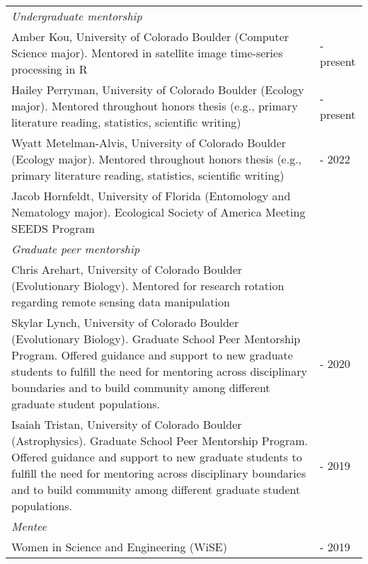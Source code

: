 \begin{longtable}{@{}>{\raggedright}p{5.25in} >{\raggedleft}X@{}}
 \addlinespace[1ex]
 
\emph{Undergraduate mentorship}  & \tabularnewline
Amber Kou, University of Colorado Boulder (Computer Science major). Mentored in satellite image time-series processing in R & 2022 - present \tabularnewline
Hailey Perryman, University of Colorado Boulder (Ecology major). Mentored throughout honors thesis (e.g., primary literature reading, statistics, scientific writing)  & 2022 - present \tabularnewline
Wyatt Metelman-Alvis, University of Colorado Boulder (Ecology major). Mentored throughout honors thesis (e.g., primary literature reading, statistics, scientific writing)  & 2021 - 2022 \tabularnewline
Jacob Hornfeldt, University of Florida (Entomology and Nematology major). Ecological Society of America Meeting SEEDS Program & 2020  \tabularnewline
 \addlinespace[1ex]
 
\emph{Graduate peer mentorship}  & \tabularnewline
Chris Arehart, University of Colorado Boulder (Evolutionary Biology). Mentored for research rotation regarding remote sensing data manipulation & 2021 \tabularnewline
Skylar Lynch, University of Colorado Boulder (Evolutionary Biology). Graduate School Peer Mentorship Program. Offered guidance and support to new graduate students to fulfill the need for mentoring across disciplinary boundaries and to build community among different graduate student populations. & 2019 - 2020 \tabularnewline
Isaiah Tristan, University of Colorado Boulder (Astrophysics). Graduate School Peer Mentorship Program. Offered guidance and support to new graduate students to fulfill the need for mentoring across disciplinary boundaries and to build community among different graduate student populations.  & 2018 - 2019  \tabularnewline
 \addlinespace[1ex]
 
\emph{Mentee}  & \tabularnewline
Women in Science and Engineering (WiSE) & 2018 - 2019 \tabularnewline

\end{longtable}


